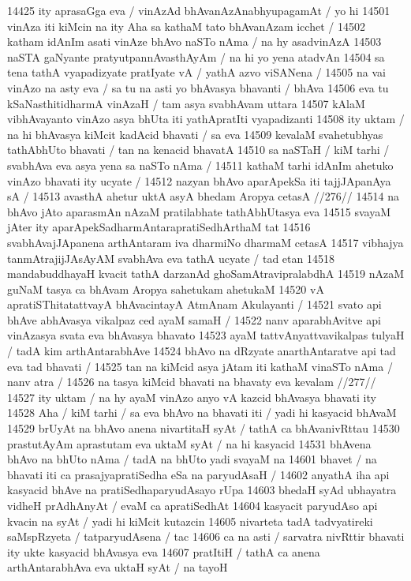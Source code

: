 14425 ity aprasaGga eva / vinAzAd bhAvanAzAnabhyupagamAt / yo hi  
14501 vinAza iti kiMcin na ity Aha sa kathaM tato bhAvanAzam icchet /
14502 katham idAnIm asati vinAze bhAvo naSTo nAma / na hy asadvinAzA 
14503 naSTA gaNyante pratyutpannAvasthAyAm / na hi yo yena atadvAn  
14504 sa tena tathA vyapadizyate pratIyate vA / yathA azvo viSANena /
14505 na vai vinAzo na asty eva / sa tu na asti yo bhAvasya bhavanti / bhAva 
14506 eva tu kSaNasthitidharmA vinAzaH / tam asya svabhAvam uttara  
14507 kAlaM vibhAvayanto vinAzo asya bhUta iti yathApratIti vyapadizanti 
14508 ity uktam / na hi bhAvasya kiMcit kadAcid bhavati / sa eva  
14509 kevalaM svahetubhyas tathAbhUto bhavati / tan na kenacid bhavatA
14510 sa naSTaH / kiM tarhi / svabhAva eva asya yena sa naSTo nAma / 
14511 kathaM tarhi idAnIm ahetuko vinAzo bhavati ity ucyate / 
14512 	nazyan bhAvo aparApekSa iti tajjJApanAya sA /  
14513 	avasthA ahetur uktA asyA bhedam Aropya cetasA //276//  
14514 na bhAvo jAto aparasmAn nAzaM pratilabhate tathAbhUtasya eva 
14515 svayaM jAter ity aparApekSadharmAntarapratiSedhArthaM tat 
14516 svabhAvajJApanena arthAntaram iva dharmiNo dharmaM cetasA  
14517 vibhajya tanmAtrajijJAsAyAM svabhAva eva tathA ucyate / tad etan  
14518 mandabuddhayaH kvacit tathA darzanAd ghoSamAtravipralabdhA  
14519 nAzaM guNaM tasya ca bhAvam Aropya sahetukam ahetukaM
14520 vA apratiSThitatattvayA bhAvacintayA AtmAnam Akulayanti /  
14521 	svato api bhAve abhAvasya vikalpaz ced ayaM samaH / 
14522 nanv aparabhAvitve api vinAzasya svata eva bhAvasya bhavato
14523 ayaM tattvAnyattvavikalpas tulyaH / tadA kim arthAntarabhAve 
14524 bhAvo na dRzyate anarthAntaratve api tad eva tad bhavati /  
14525 tan na kiMcid asya jAtam iti kathaM vinaSTo nAma / nanv atra / 
14526 	na tasya kiMcid bhavati na bhavaty eva kevalam //277//
14527 ity uktam / na hy ayaM vinAzo anyo vA kazcid bhAvasya bhavati ity
14528 Aha / kiM tarhi / sa eva bhAvo na bhavati iti / yadi hi kasyacid bhAvaM
14529 brUyAt na bhAvo anena nivartitaH syAt / tathA ca bhAvanivRttau  
14530 prastutAyAm aprastutam eva uktaM syAt / na hi kasyacid  
14531 bhAvena bhAvo na bhUto nAma / tadA na bhUto yadi svayaM na 
14601 bhavet / na bhavati iti ca prasajyapratiSedha eSa na paryudAsaH /  
14602 anyathA iha api kasyacid bhAve na pratiSedhaparyudAsayo rUpa  
14603 bhedaH syAd ubhayatra vidheH prAdhAnyAt / evaM ca apratiSedhAt 
14604 kasyacit paryudAso api kvacin na syAt / yadi hi kiMcit kutazcin
14605 nivarteta tadA tadvyatireki saMspRzyeta / tatparyudAsena / tac  
14606 ca na asti / sarvatra nivRttir bhavati ity ukte kasyacid bhAvasya eva 
14607 pratItiH / tathA ca anena arthAntarabhAva eva uktaH syAt / na tayoH
